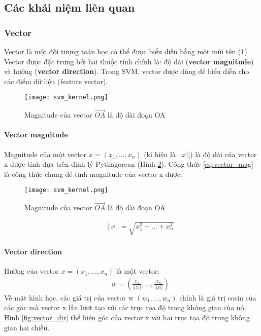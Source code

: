 \subsection{Các khái niệm liên quan}
\subsubsection*{Vector}
Vector là một đối tượng toán học có thể được biểu diễn bằng một mũi tên (\ref{fig:vector}). Vector được đặc trưng bởi hai thuộc tính chính là: độ dài (\textbf{vector magnitude}) và hướng (\textbf{vector direction}). Trong SVM, vector được dùng để biểu diễn cho các điểm dữ liệu (feature vector).
\begin{figure}[h!]
	\centering
	\captionsetup{width=0.8\textwidth}
	\texttt{[image: svm\_kernel.png]}
	\caption{Magnitude của vector $\vec{OA}$ là độ dài đoạn OA}
    \label{fig:vector}
\end{figure}

\paragraph*{Vector magnitude}
Magnitude của một vector $x = (x_1, ..., x_n)$ (kí hiệu là $||x||$) là độ dài của vector x được tính dựa trên định lý Pythagorean (Hình \ref{fig:vector_mag}). Công thức \ref{eq:vector_mag} là công thức chung để tính magnitude của vector x được.
\begin{figure}[h!]
	\centering
	\captionsetup{width=0.8\textwidth}
	\texttt{[image: svm\_kernel.png]}
	\caption{Magnitude của vector $\vec{OA}$ là độ dài đoạn OA}
    \label{fig:vector_mag}
\end{figure}
\begin{eqnarray}
\label{eq:vector_mag}
\hspace{1cm} ||x|| = \sqrt{x_1^2 + ... + x_n^2}
\end{eqnarray}
\paragraph*{Vector direction}
Hướng của vector $x = (x_1, ..., x_n)$ là một vector:
\begin{eqnarray}
\label{eq:vector_dir}
\hspace{1cm} w = (\frac{x_1}{||x||}, ..., \frac{x_n}{||x||})
\end{eqnarray}
Về mặt hình học, các giá trị của vector w $(w_1, ..., w_n)$ chính là giá trị cosin của các góc mà vector x lần lượt tạo với các trục tọa độ trong không gian của nó. Hình \ref{fig:vector_dir} thể hiện góc của vector x với hai trục tọa độ trong không gian hai chiều.

